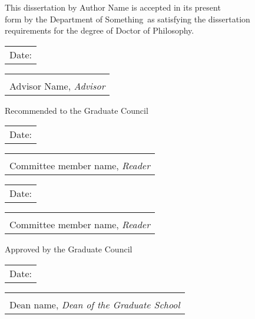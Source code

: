 \documentclass[12pt]{article}
\makeatletter
\newcommand{\dateline}{
    \begin{tabular}[t]{@{}l@{}}
        Date: \underline{\hspace{3cm}}
    \end{tabular}
}
\newcommand{\signatureline}[1]{
    \begin{tabular}[t]{@{}l@{}}
        \underline{\hspace{8.75cm}} \\[-1ex]
        #1 %
    \end{tabular}
}
\newcommand{\department}{Department of Something}
\makeatother
\begin{document}
\thispagestyle{empty} %

\begin{center}
    \vspace*{0cm} 
    This dissertation by Author Name is accepted in its present\\
    form by the \department\ as satisfying the dissertation \\
    requirements for the degree of Doctor of Philosophy.
\end{center}

\vspace{1.25cm}

\begin{minipage}{0.99\textwidth}
    \doublespacing
    \dateline \hspace{1.5cm} \signatureline{Advisor Name, \textit{Advisor}}
    
    \vspace{1cm}
    \begin{center}
        Recommended to the Graduate Council
    \end{center}
    \vspace{1.25cm}
    
    \dateline \hspace{1.5cm} \signatureline{Committee member name, \textit{Reader}}
    \vspace{1cm}
    
    \dateline \hspace{1.5cm} \signatureline{Committee member name, \textit{Reader}}
    \vspace{1cm}    

    \begin{center}
        Approved by the Graduate Council
    \end{center}
    \vspace{1.25cm}
    
    \dateline \hspace{1.5cm} \signatureline{Dean name, \textit{Dean of the Graduate School}}
\end{minipage}
\end{document}
